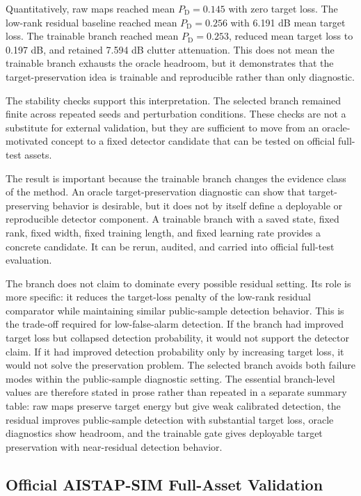 \documentclass[journal]{IEEEtran}
\begin{document}
Quantitatively, raw maps reached mean $P_{\mathrm{D}}=0.145$ with zero target loss. The low-rank residual baseline reached mean $P_{\mathrm{D}}=0.256$ with 6.191 dB mean target loss. The trainable branch reached mean $P_{\mathrm{D}}=0.253$, reduced mean target loss to 0.197 dB, and retained 7.594 dB clutter attenuation. This does not mean the trainable branch exhausts the oracle headroom, but it demonstrates that the target-preservation idea is trainable and reproducible rather than only diagnostic.

The stability checks support this interpretation. The selected branch remained finite across repeated seeds and perturbation conditions. These checks are not a substitute for external validation, but they are sufficient to move from an oracle-motivated concept to a fixed detector candidate that can be tested on official full-test assets.

The result is important because the trainable branch changes the evidence class of the method. An oracle target-preservation diagnostic can show that target-preserving behavior is desirable, but it does not by itself define a deployable or reproducible detector component. A trainable branch with a saved state, fixed rank, fixed width, fixed training length, and fixed learning rate provides a concrete candidate. It can be rerun, audited, and carried into official full-test evaluation.

The branch does not claim to dominate every possible residual setting. Its role is more specific: it reduces the target-loss penalty of the low-rank residual comparator while maintaining similar public-sample detection behavior. This is the trade-off required for low-false-alarm detection. If the branch had improved target loss but collapsed detection probability, it would not support the detector claim. If it had improved detection probability only by increasing target loss, it would not solve the preservation problem. The selected branch avoids both failure modes within the public-sample diagnostic setting. The essential branch-level values are therefore stated in prose rather than repeated in a separate summary table: raw maps preserve target energy but give weak calibrated detection, the residual improves public-sample detection with substantial target loss, oracle diagnostics show headroom, and the trainable gate gives deployable target preservation with near-residual detection behavior.

\subsection{Official AISTAP-SIM Full-Asset Validation}
\end{document}
